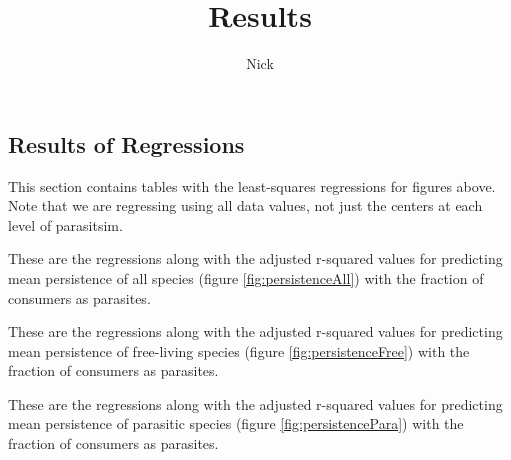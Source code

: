 \documentclass[11pt]{amsart}
\title{Results}
\author{Nick}
\begin{document}

\begin{appendix}

\section{Results of Regressions\label{app:Regressions}}

This section contains tables with the least-squares regressions for figures above.  Note that we are regressing using all data values, not just the centers at each level of parasitsim. 

\begin{table}

\caption{These are the regressions along with the adjusted r-squared values for predicting mean persistence of all species (figure \ref{fig:persistenceAll}) with the fraction of consumers as parasites.\label{tab:persistenceAll}} 
\end{table}

\begin{table}

\caption{These are the regressions along with the adjusted r-squared values for predicting mean persistence of free-living species (figure \ref{fig:persistenceFree}) with the fraction of consumers as parasites.\label{tab:persistenceFree}} 
\end{table}

\begin{table}

\caption{These are the regressions along with the adjusted r-squared values for predicting mean persistence of parasitic species (figure \ref{fig:persistencePara}) with the fraction of consumers as parasites.\label{tab:persistencePara}} 
\end{table}
\end{appendix}
\end{document}
